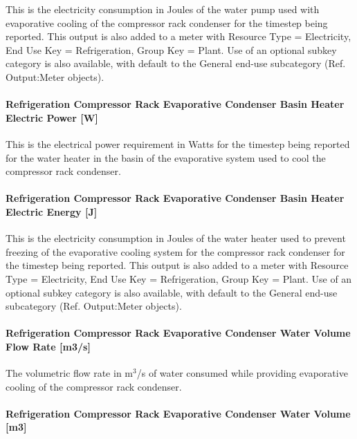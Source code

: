This is the electricity consumption in Joules of the water pump used with evaporative cooling of the compressor rack condenser for the timestep being reported. This output is also added to a meter with Resource Type = Electricity, End Use Key = Refrigeration, Group Key = Plant. Use of an optional subkey category is also available, with default to the General end-use subcategory (Ref. Output:Meter objects).

\paragraph{Refrigeration Compressor Rack Evaporative Condenser Basin Heater Electric Power {[}W{]}}\label{refrigeration-compressor-rack-evaporative-condenser-basin-heater-electric-power-w}

This is the electrical power requirement in Watts for the timestep being reported for the water heater in the basin of the evaporative system used to cool the compressor rack condenser.

\paragraph{Refrigeration Compressor Rack Evaporative Condenser Basin Heater Electric Energy {[}J{]}}\label{refrigeration-compressor-rack-evaporative-condenser-basin-heater-electric-energy-j}

This is the electricity consumption in Joules of the water heater used to prevent freezing of the evaporative cooling system for the compressor rack condenser for the timestep being reported. This output is also added to a meter with Resource Type = Electricity, End Use Key = Refrigeration, Group Key = Plant. Use of an optional subkey category is also available, with default to the General end-use subcategory (Ref. Output:Meter objects).

\paragraph{Refrigeration Compressor Rack Evaporative Condenser Water Volume Flow Rate {[}m3/s{]}}\label{refrigeration-compressor-rack-evaporative-condenser-water-volume-flow-rate-m3s}

The volumetric flow rate in m\(^{3}\)/s of water consumed while providing evaporative cooling of the compressor rack condenser.

\paragraph{Refrigeration Compressor Rack Evaporative Condenser Water Volume {[}m3{]}}\label{refrigeration-compressor-rack-evaporative-condenser-water-volume-m3}

